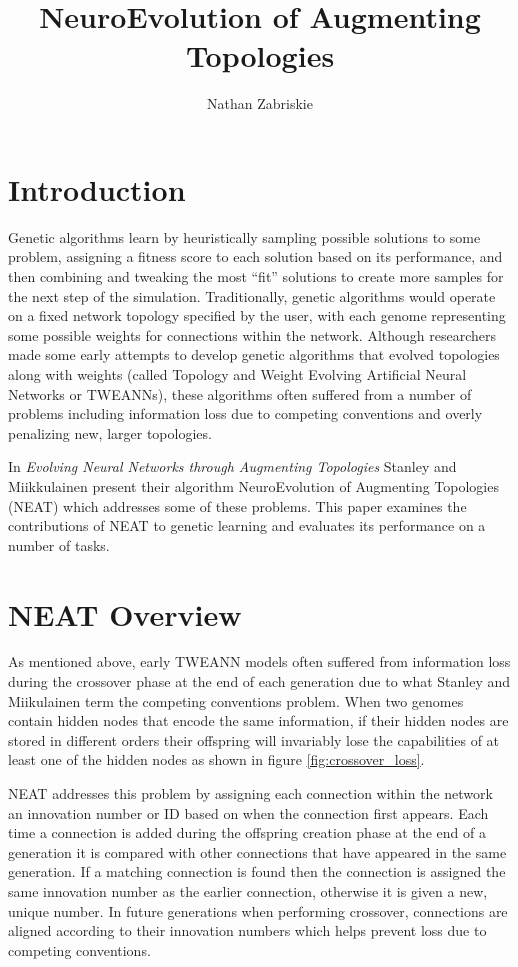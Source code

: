 \documentclass[twocolumn,letterpaper]{article}
\title{NeuroEvolution of Augmenting Topologies}
\author{Nathan Zabriskie}
\begin{document}
\maketitle

\section{Introduction} \label{sec:intro} 
Genetic algorithms learn by heuristically sampling possible solutions to some problem, assigning a fitness
score to each solution based on its performance, and then combining and tweaking the most 
``fit'' solutions to create more samples for the next step of the simulation. Traditionally, 
genetic algorithms would operate on a fixed network topology specified by the user, with each 
genome representing some possible weights for connections within the network. Although
researchers made some early attempts to develop genetic algorithms that evolved topologies along with 
weights (called Topology and Weight Evolving Artificial Neural Networks or TWEANNs), 
these algorithms often suffered from a number of problems including information loss due to competing 
conventions and overly penalizing new, larger topologies. 

In \textit{Evolving Neural Networks through Augmenting Topologies} \cite{neat_paper} Stanley and 
Miikkulainen present their algorithm NeuroEvolution of Augmenting Topologies (NEAT) which addresses some of
these problems. This paper examines the contributions of NEAT to genetic learning and evaluates its
performance on a number of tasks.

\section{NEAT Overview} \label{sec:overview}
As mentioned above, early TWEANN models often suffered from information loss during the crossover phase
at the end of each generation due to what Stanley and Miikulainen term the competing conventions problem.
When two genomes contain hidden nodes that encode the same information, if their hidden nodes are stored 
in different orders their offspring will invariably lose the capabilities of at least one of the 
hidden nodes as shown in figure \ref{fig:crossover_loss}. 

NEAT addresses this problem by assigning each connection within the network an innovation number or ID based on
when the connection first appears. Each time a connection is added during the offspring creation phase at the end of a generation it is compared with other connections that have appeared in the same generation. 
If a matching connection is found then the connection is assigned the same innovation number as the earlier
connection, otherwise it is given a new, unique number. In future generations when performing crossover,
connections are aligned according to their innovation numbers which helps prevent loss due to competing
conventions. 
\end{document}
